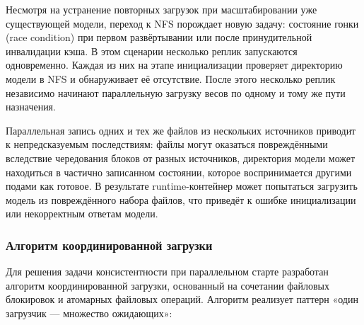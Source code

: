Несмотря на устранение повторных загрузок при масштабировании уже существующей модели, переход к NFS порождает новую задачу: состояние гонки (race condition) при первом развёртывании или после принудительной инвалидации кэша. В этом сценарии несколько реплик запускаются одновременно. Каждая из них на этапе инициализации проверяет директорию модели в NFS и обнаруживает её отсутствие. После этого несколько реплик независимо начинают параллельную загрузку весов по одному и тому же пути назначения.

Параллельная запись одних и тех же файлов из нескольких источников приводит к непредсказуемым последствиям: файлы могут оказаться повреждёнными вследствие чередования блоков от разных источников, директория модели может находиться в частично записанном состоянии, которое воспринимается другими подами как готовое. В результате runtime-контейнер может попытаться загрузить модель из повреждённого набора файлов, что приведёт к ошибке инициализации или некорректным ответам модели.

\subsubsection{Алгоритм координированной загрузки}

Для решения задачи консистентности при параллельном старте разработан алгоритм координированной загрузки, основанный на сочетании файловых блокировок и атомарных файловых операций. Алгоритм реализует паттерн «один загрузчик --- множество ожидающих»:

